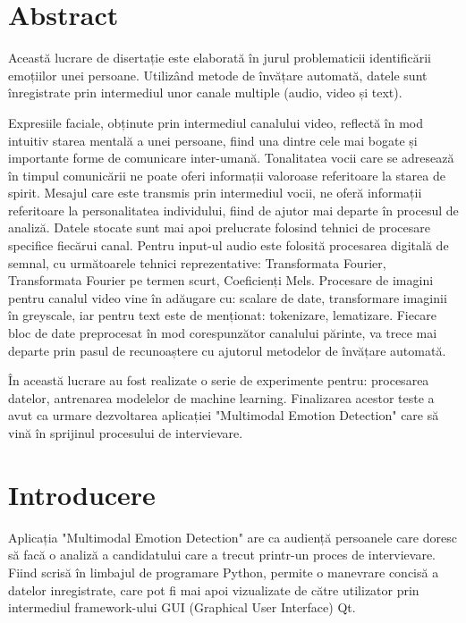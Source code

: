 \documentclass[a4paper, 12pt]{report}
\begin{document}
	\nocite{*}
	
	
	\newpage
	\tableofcontents
	\newpage
	\renewcommand\lstlistlistingname{Secvențe de cod}
	\renewcommand{\lstlistingname}{Secvență de cod}
	
	\section{Abstract}	
	Această lucrare de disertație este elaborată în jurul problematicii identificării emoțiilor unei persoane. Utilizând metode de învățare automată, datele sunt înregistrate prin intermediul unor canale multiple (audio, video și text). 
	
	Expresiile faciale, obținute prin intermediul canalului video, reflectă în mod intuitiv starea mentală a unei persoane, fiind una dintre cele mai bogate și importante forme de comunicare inter-umană. Tonalitatea vocii care se adresează în timpul comunicării ne poate oferi informații valoroase referitoare la starea de spirit. Mesajul care este transmis prin intermediul vocii, ne oferă informații referitoare la personalitatea individului, fiind de ajutor mai departe în procesul de analiză.
	Datele stocate sunt mai apoi prelucrate folosind tehnici de procesare specifice fiecărui canal. Pentru input-ul audio este folosită procesarea digitală de semnal, cu următoarele tehnici reprezentative: Transformata Fourier, Transformata Fourier pe termen scurt, Coeficienți Mels. Procesare de imagini pentru canalul video vine în adăugare cu: scalare de date, transformare imaginii în greyscale, iar pentru text este de menționat: tokenizare, lematizare. Fiecare bloc de date preprocesat în mod corespunzător canalului părinte, va trece mai departe prin pasul de recunoaștere cu ajutorul metodelor de învățare automată.
	
	
	În această lucrare au fost realizate o serie de experimente pentru: procesarea datelor, antrenarea modelelor de machine learning. Finalizarea acestor teste a avut ca urmare dezvoltarea aplicației "Multimodal Emotion Detection" care să vină în sprijinul procesului de intervievare.
	\clearpage
	
	\section{Introducere}
	Aplicația "Multimodal Emotion Detection" are ca audiență persoanele care doresc să facă o analiză a candidatului care a trecut printr-un proces de intervievare. Fiind scrisă în limbajul de programare Python, permite o manevrare concisă a datelor inregistrate, care pot fi mai apoi vizualizate de către utilizator prin intermediul framework-ului GUI (Graphical User Interface) Qt.
	
\end{document}

